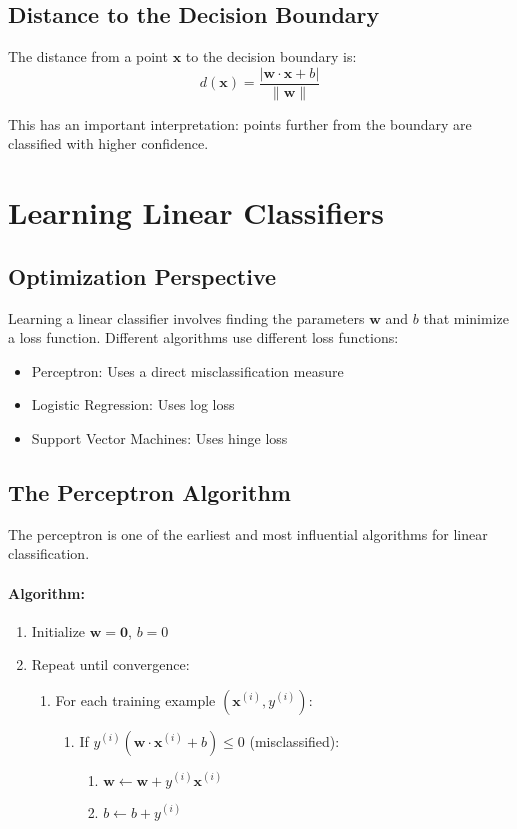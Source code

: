 \documentclass{article}
\begin{document}
\subsection{Distance to the Decision Boundary}
The distance from a point $\mathbf{x}$ to the decision boundary is:
\[
d(\mathbf{x}) = \frac{|\mathbf{w} \cdot \mathbf{x} + b|}{\|\mathbf{w}\|}
\]

This has an important interpretation: points further from the boundary are classified with higher confidence.

\section{Learning Linear Classifiers}

\subsection{Optimization Perspective}
Learning a linear classifier involves finding the parameters $\mathbf{w}$ and $b$ that minimize a loss function. Different algorithms use different loss functions:

\begin{itemize}
    \item Perceptron: Uses a direct misclassification measure
    \item Logistic Regression: Uses log loss
    \item Support Vector Machines: Uses hinge loss
\end{itemize}

\subsection{The Perceptron Algorithm}
The perceptron is one of the earliest and most influential algorithms for linear classification.

\paragraph{Algorithm:}
\begin{enumerate}
    \item Initialize $\mathbf{w} = \mathbf{0}$, $b = 0$
    \item Repeat until convergence:
    \begin{enumerate}
        \item For each training example $(\mathbf{x}^{(i)}, y^{(i)})$:
        \begin{enumerate}
            \item If $y^{(i)}(\mathbf{w} \cdot \mathbf{x}^{(i)} + b) \leq 0$ (misclassified):
            \begin{enumerate}
                \item $\mathbf{w} \leftarrow \mathbf{w} + y^{(i)}\mathbf{x}^{(i)}$
                \item $b \leftarrow b + y^{(i)}$
            \end{enumerate}
        \end{enumerate}
    \end{enumerate}
\end{enumerate}
\end{document}
